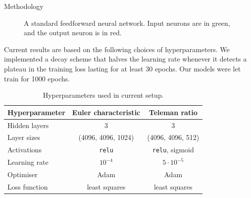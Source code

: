 \documentclass[final,20pt]{beamer}
\newlength{\colwidth}
\begin{document}
\begin{frame}[t]
\begin{columns}[t]
\begin{column}{\colwidth}
\begin{block}{Methodology}
\begin{figure}
      \caption{A standard feedforward neural network. Input neurons are in green, and
      the output neuron is in red.}
    \end{figure}

    Current results are based on the following choices of hyperparameters.
    We implemented a decay scheme that halves the learning rate
    whenever it detects a plateau in the training loss lasting for at least 30 epochs.
    Our models were let train for 1000 epochs.

    \begin{table}
      \centering
      \begin{tabular}{lcc}
        \toprule
        Hyperparameter & Euler characteristic & Teleman ratio\\
        \midrule
        Hidden layers             & 3                   & 3\\
        Layer sizes               & (4096, 4096, 1024)  & (4096, 4096, 512)\\
        Activations               & {\tt{relu}}         & {\tt{relu}}, sigmoid\\
        Learning rate             & $10^{-4}$           & $5 \cdot 10^{-5}$\\
        Optimiser                 & Adam                & Adam\\
        Loss function             & least squares       & least squares\\
        \bottomrule
      \end{tabular}
      \caption{Hyperparameters used in current setup.}
    \end{table}



\end{block}
\end{column}
\end{columns}
\end{frame}
\end{document}

